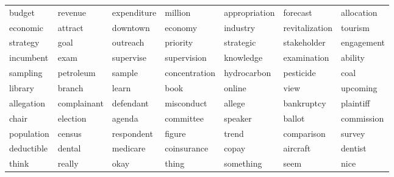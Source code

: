 \begin{table}[ht]
\begin{tabular}{lllllll}
  \cellcolor{blue!20}budget & \cellcolor{blue!20}revenue & \cellcolor{blue!20}expenditure & \cellcolor{blue!20}million & \cellcolor{blue!20}appropriation & \cellcolor{blue!20}forecast & \cellcolor{blue!20}allocation \\ 
  \cellcolor{white}economic & \cellcolor{white}attract & \cellcolor{white}downtown & \cellcolor{white}economy & \cellcolor{white}industry & \cellcolor{white}revitalization & \cellcolor{white}tourism \\ 
  \cellcolor{blue!10}strategy & \cellcolor{blue!10}goal & \cellcolor{blue!10}outreach & \cellcolor{blue!10}priority & \cellcolor{blue!10}strategic & \cellcolor{blue!10}stakeholder & \cellcolor{blue!10}engagement \\ 
  \cellcolor{white}incumbent & \cellcolor{white}exam & \cellcolor{white}supervise & \cellcolor{white}supervision & \cellcolor{white}knowledge & \cellcolor{white}examination & \cellcolor{white}ability \\ 
  \cellcolor{red!10}sampling & \cellcolor{red!10}petroleum & \cellcolor{red!10}sample & \cellcolor{red!10}concentration & \cellcolor{red!10}hydrocarbon & \cellcolor{red!10}pesticide & \cellcolor{red!10}coal \\ 
  \cellcolor{red!10}library & \cellcolor{red!10}branch & \cellcolor{red!10}learn & \cellcolor{red!10}book & \cellcolor{red!10}online & \cellcolor{red!10}view & \cellcolor{red!10}upcoming \\ 
  \cellcolor{blue!10}allegation & \cellcolor{blue!10}complainant & \cellcolor{blue!10}defendant & \cellcolor{blue!10}misconduct & \cellcolor{blue!10}allege & \cellcolor{blue!10}bankruptcy & \cellcolor{blue!10}plaintiff \\ 
  \cellcolor{blue!20}chair & \cellcolor{blue!20}election & \cellcolor{blue!20}agenda & \cellcolor{blue!20}committee & \cellcolor{blue!20}speaker & \cellcolor{blue!20}ballot & \cellcolor{blue!20}commission \\ 
  \cellcolor{blue!10}population & \cellcolor{blue!10}census & \cellcolor{blue!10}respondent & \cellcolor{blue!10}figure & \cellcolor{blue!10}trend & \cellcolor{blue!10}comparison & \cellcolor{blue!10}survey \\ 
  \cellcolor{red!10}deductible & \cellcolor{red!10}dental & \cellcolor{red!10}medicare & \cellcolor{red!10}coinsurance & \cellcolor{red!10}copay & \cellcolor{red!10}aircraft & \cellcolor{red!10}dentist \\ 
  \cellcolor{red!20}think & \cellcolor{red!20}really & \cellcolor{red!20}okay & \cellcolor{red!20}thing & \cellcolor{red!20}something & \cellcolor{red!20}seem & \cellcolor{red!20}nice \\ 

\end{tabular}
\end{table}
